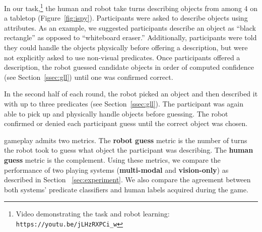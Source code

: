In our \ispy task,\footnote{Video demonstrating the \ispy task and robot learning: \texttt{https://youtu.be/jLHzRXPCi\_w}} the human and robot take turns describing objects from among 4 on a tabletop (Figure~\ref{fig:ispy}).
Participants were asked to describe objects using attributes.
As an example, we suggested participants describe an object as ``black rectangle'' as opposed to ``whiteboard eraser.''
Additionally, participants were told they could handle the objects physically before offering a description, but were not explicitly asked to use non-visual predicates.
Once participants offered a description, the robot guessed candidate objects in order of computed confidence (see Section~\ref{ssec:gll}) until one was confirmed correct.

In the second half of each round, the robot picked an object and then described it with up to three predicates (see Section~\ref{ssec:gll}).
The participant was again able to pick up and physically handle objects before guessing.
The robot confirmed or denied each participant guess until the correct object was chosen.

\ispy gameplay admits two metrics.
The \textbf{robot guess} metric is the number of turns the robot took to guess what object the participant was describing.
The \textbf{human guess} metric is the complement.
Using these metrics, we compare the performance of two \ispy playing systems (\textbf{multi-modal} and \textbf{vision-only}) as described in Section ~\ref{sec:experiment}.
We also compare the agreement between both systems' predicate classifiers and human labels acquired during the game.